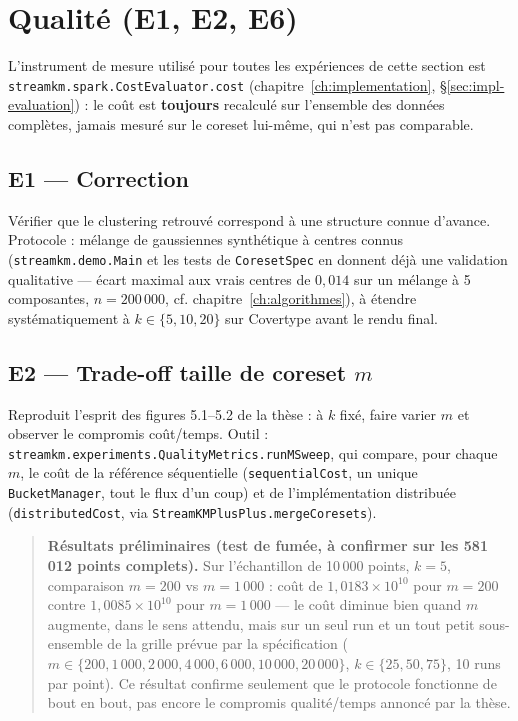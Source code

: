 \section{Qualité (E1, E2, E6)}
\label{sec:eval-qualite}

L'instrument de mesure utilisé pour toutes les expériences de cette section
est \texttt{streamkm.spark.CostEvaluator.cost}
(chapitre~\ref{ch:implementation}, §\ref{sec:impl-evaluation}) : le coût est
\textbf{toujours} recalculé sur l'ensemble des données complètes, jamais
mesuré sur le coreset lui-même, qui n'est pas comparable.

\subsection{E1 --- Correction}

Vérifier que le clustering retrouvé correspond à une structure connue
d'avance. Protocole : mélange de gaussiennes synthétique à centres connus
(\texttt{streamkm.demo.Main} et les tests de \texttt{CoresetSpec} en
donnent déjà une validation qualitative --- écart maximal aux vrais centres
de $0{,}014$ sur un mélange à 5 composantes, $n=200\,000$, cf.
chapitre~\ref{ch:algorithmes}), à étendre systématiquement à $k \in
\{5,10,20\}$ sur Covertype avant le rendu final.


\subsection{E2 --- Trade-off taille de coreset $m$}

Reproduit l'esprit des figures 5.1--5.2 de la thèse : à $k$ fixé, faire
varier $m$ et observer le compromis coût/temps. Outil :
\texttt{streamkm.experiments.QualityMetrics.runMSweep}, qui compare, pour
chaque $m$, le coût de la référence séquentielle (\texttt{sequentialCost},
un unique \texttt{BucketManager}, tout le flux d'un coup) et de
l'implémentation distribuée (\texttt{distributedCost}, via
\texttt{StreamKMPlusPlus.mergeCoresets}).

\begin{quote}
\textbf{Résultats préliminaires (test de fumée, à confirmer sur les 581\,012
points complets).} Sur l'échantillon de 10\,000 points, $k=5$, comparaison
$m=200$ vs $m=1\,000$ : coût de $1{,}0183 \times 10^{10}$ pour $m=200$
contre $1{,}0085\times10^{10}$ pour $m=1\,000$ --- le coût diminue bien
quand $m$ augmente, dans le sens attendu, mais sur un seul run et un tout
petit sous-ensemble de la grille prévue par la spécification
($m \in \{200,\allowbreak 1\,000,\allowbreak 2\,000,\allowbreak
4\,000,\allowbreak 6\,000,\allowbreak 10\,000,\allowbreak 20\,000\}$,
$k \in \{25,50,75\}$, 10 runs par point). Ce résultat confirme seulement
que le protocole fonctionne de bout en bout, pas encore le compromis
qualité/temps annoncé par la thèse.
\end{quote}

